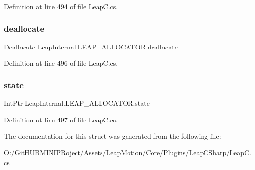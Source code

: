 Definition at line 494 of file Leap\+C.\+cs.

\mbox{\label{struct_leap_internal_1_1_l_e_a_p___a_l_l_o_c_a_t_o_r_a8f4412b62bf9cb6548aa0110838e62f2}} 
\subsubsection{\texorpdfstring{deallocate}{deallocate}}
{\footnotesize\ttfamily \mbox{\hyperlink{namespace_leap_internal_a5a737b35c25482e1d39e14a9d766553a}{Deallocate}} Leap\+Internal.\+L\+E\+A\+P\+\_\+\+A\+L\+L\+O\+C\+A\+T\+O\+R.\+deallocate}



Definition at line 496 of file Leap\+C.\+cs.

\mbox{\label{struct_leap_internal_1_1_l_e_a_p___a_l_l_o_c_a_t_o_r_a19bd54e9bca5966f40c0677a69b30329}} 
\subsubsection{\texorpdfstring{state}{state}}
{\footnotesize\ttfamily Int\+Ptr Leap\+Internal.\+L\+E\+A\+P\+\_\+\+A\+L\+L\+O\+C\+A\+T\+O\+R.\+state}



Definition at line 497 of file Leap\+C.\+cs.



The documentation for this struct was generated from the following file\+:\begin{DoxyCompactItemize}
\item 
O\+:/\+Git\+H\+U\+B\+M\+I\+N\+I\+P\+Roject/\+Assets/\+Leap\+Motion/\+Core/\+Plugins/\+Leap\+C\+Sharp/\mbox{\hyperlink{_leap_c_8cs}{Leap\+C.\+cs}}\end{DoxyCompactItemize}
